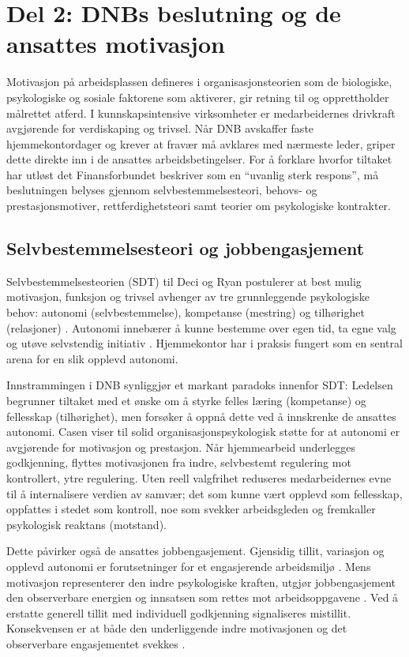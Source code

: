 \section{Del 2: DNBs beslutning og de ansattes motivasjon}

Motivasjon på arbeidsplassen defineres i organisasjonsteorien som de biologiske, psykologiske og sosiale faktorene som aktiverer, gir retning til og opprettholder målrettet atferd. I kunnskapsintensive virksomheter er medarbeidernes drivkraft avgjørende for verdiskaping og trivsel. Når DNB avskaffer faste hjemmekontordager og krever at fravær må avklares med nærmeste leder, griper dette direkte inn i de ansattes arbeidsbetingelser. For å forklare hvorfor tiltaket har utløst det Finansforbundet beskriver som en \enquote{uvanlig sterk respons}, må beslutningen belyses gjennom selvbestemmelsesteori, behovs- og prestasjonsmotiver, rettferdighetsteori samt teorier om psykologiske kontrakter.

\subsection{Selvbestemmelsesteori og jobbengasjement}

Selvbestemmelsesteorien (SDT) til Deci og Ryan postulerer at best mulig motivasjon, funksjon og trivsel avhenger av tre grunnleggende psykologiske behov: autonomi (selvbestemmelse), kompetanse (mestring) og tilhørighet (relasjoner) \parencite[s.~101--102]{nerstad2023}. Autonomi innebærer å kunne bestemme over egen tid, ta egne valg og utøve selvstendig initiativ \parencite[s.~101--102]{nerstad2023}. Hjemmekontor har i praksis fungert som en sentral arena for en slik opplevd autonomi.

Innstrammingen i DNB synliggjør et markant paradoks innenfor SDT: Ledelsen begrunner tiltaket med et ønske om å styrke felles læring (kompetanse) og fellesskap (tilhørighet), men forsøker å oppnå dette ved å innskrenke de ansattes autonomi. Casen viser til solid organisasjonspsykologisk støtte for at autonomi er avgjørende for motivasjon og prestasjon. Når hjemmearbeid underlegges godkjenning, flyttes motivasjonen fra indre, selvbestemt regulering mot kontrollert, ytre regulering. Uten reell valgfrihet reduseres medarbeidernes evne til å internalisere verdien av samvær; det som kunne vært opplevd som fellesskap, oppfattes i stedet som kontroll, noe som svekker arbeidsgleden og fremkaller psykologisk reaktans (motstand).

Dette påvirker også de ansattes jobbengasjement. Gjensidig tillit, variasjon og opplevd autonomi er forutsetninger for et engasjerende arbeidsmiljø \parencite[s.~152]{einarsen2023}. Mens motivasjon representerer den indre psykologiske kraften, utgjør jobbengasjement den observerbare energien og innsatsen som rettes mot arbeidsoppgavene \parencite[s.~152]{einarsen2023}. Ved å erstatte generell tillit med individuell godkjenning signaliseres mistillit. Konsekvensen er at både den underliggende indre motivasjonen og det observerbare engasjementet svekkes \parencite[s.~152]{einarsen2023}.

